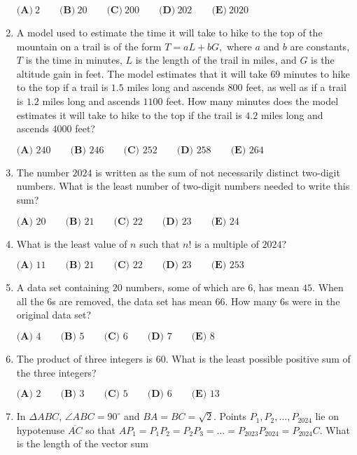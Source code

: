 \documentclass{article}
\begin{document}
\begin{enumerate}[label=\arabic*., itemsep=0.5em]
\(\textbf{(A)}~2\qquad\textbf{(B)}~20\qquad\textbf{(C)}~200\qquad\textbf{(D)}~202\qquad\textbf{(E)}~2020\)\par \vspace{0.5em}\item A model used to estimate the time it will take to hike to the top of the mountain on a trail is of the form \(T=aL+bG,\) where \(a\) and \(b\) are constants, \(T\) is the time in minutes, \(L\) is the length of the trail in miles, and \(G\) is the altitude gain in feet. The model estimates that it will take \(69\) minutes to hike to the top if a trail is \(1.5\) miles long and ascends \(800\) feet, as well as if a trail is \(1.2\) miles long and ascends \(1100\) feet. How many minutes does the model estimates it will take to hike to the top if the trail is \(4.2\) miles long and ascends \(4000\) feet?

\(\textbf{(A) }240\qquad\textbf{(B) }246\qquad\textbf{(C) }252\qquad\textbf{(D) }258\qquad\textbf{(E) }264\)\par \vspace{0.5em}\item The number \(2024\) is written as the sum of not necessarily distinct two-digit numbers. What is the least number of two-digit numbers needed to write this sum?

\(\textbf{(A) }20\qquad\textbf{(B) }21\qquad\textbf{(C) }22\qquad\textbf{(D) }23\qquad\textbf{(E) }24\)\par \vspace{0.5em}\item What is the least value of \(n\) such that \(n!\) is a multiple of \(2024\)?

\(
\textbf{(A) }11 \qquad
\textbf{(B) }21 \qquad
\textbf{(C) }22 \qquad
\textbf{(D) }23 \qquad
\textbf{(E) }253 \qquad
\)\par \vspace{0.5em}\item A data set containing \(20\) numbers, some of which are \(6\), has mean \(45\). When all the 6s are removed, the data set has mean \(66\). How many 6s were in the original data set?

\(\textbf{(A) }4\qquad\textbf{(B) }5\qquad\textbf{(C) }6\qquad\textbf{(D) }7\qquad\textbf{(E) }8\)\par \vspace{0.5em}\item The product of three integers is \(60\). What is the least possible positive sum of the three integers?

\(\textbf{(A) } 2 \qquad \textbf{(B) } 3 \qquad \textbf{(C) } 5 \qquad \textbf{(D) } 6 \qquad \textbf{(E) } 13\)\par \vspace{0.5em}\item In \(\Delta ABC\), \(\angle ABC = 90^\circ\) and \(BA = BC = \sqrt{2}\). Points \(P_1, P_2, \dots, P_{2024}\) lie on hypotenuse \(\overline{AC}\) so that \(AP_1= P_1P_2 = P_2P_3 = \dots = P_{2023}P_{2024} = P_{2024}C\). What is the length of the vector sum


\end{enumerate}
\end{document}
